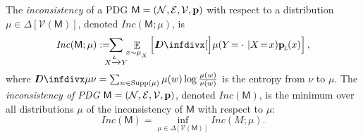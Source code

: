 \documentclass{article}
\def\sheq{\!=\!}
\newcommand{\bmu}{\boldsymbol{\mu}}
\newcommand{\bp}[1][L]{\mat{p}_{\!_{#1}\!}}
\newcommand{\V}{\mathcal V}
\newcommand{\sfM}{\mathsf M}
\newcommand\inconsist{\mathit{Inc}}
\numberwithin{equation}{section}
\begin{document}
	\begin{defn}\label{def:zeta-score}
       	  The \emph{inconsistency} of a PDG $\sfM = \mnvars[]$ with
          respect to a distribution $\mu \in \Delta[\V(\sfM)]$,
          denoted $\inconsist(\sfM;\mu)$, is  
	  \[
			\inconsist(\sfM ; \mu) := %
			\!\!\!\!\!\sum_{X \xrightarrow{\!\!L} Y}\!\!
                        \mathop{\mathbb E}_{x \sim \mu_{_X}}
                        \left[\kldiv[\Big]{ \mu(Y\!= \cdot\ | X \sheq
                                                        x) }{\bp(x) } \right] ,
		\]
		where $\kldiv{\mu}{\nu} = \sum_{w \in \text{Supp($\mu$)}} \mu(w) \log\frac{\mu(w)}{\nu(w)}$ is the entropy from $\nu$ to $\mu$.
        The \emph{inconsistency of PDG $\sfM = \mnvars[]$},
                denoted $\inconsist(\sfM)$, is the
        minimum over all distributions $\mu$ of the inconsistency of $\sfM$ with respect to $\mu$:  
		\[ \inconsist(\sfM) = \inf_{\mu \in \Delta [\V(\sfM)]}
                \inconsist (M; \mu) . \]
        \end{defn}
\end{document}
